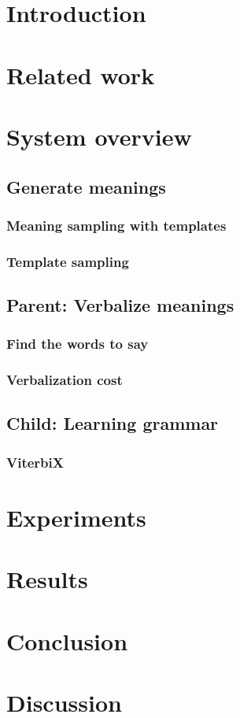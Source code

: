 \documentclass[a4paper]{article}
\begin{document}
\section{Introduction}
\section{Related work}
\section{System overview}
\subsection{Generate meanings}
\subsubsection{Meaning sampling with templates}
\subsubsection{Template sampling}
\subsection{Parent: Verbalize meanings}
\subsubsection{Find the words to say}
\subsubsection{Verbalization cost}
\subsection{Child: Learning grammar}
\subsubsection{ViterbiX}
\section{Experiments}
\section{Results}
\section{Conclusion}
\section{Discussion}
\end{document}
